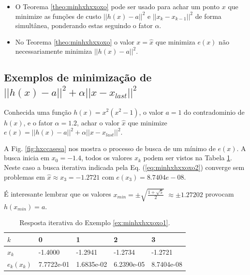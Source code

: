 \begin{tcbattention}
\begin{itemize}
\item O Teorema \ref{theo:minhxhxxoxo} pode ser usado para achar um ponto $x$
que minimize as funções de custo $||h(x)-a||^2$ e
 $||x_{k}-x_{k-1}||^2$ de forma simultânea, ponderando estas seguindo o fator $\alpha$.
\item No Teorema \ref{theo:minhxhxxoxo} o valor $x=\hat{x}$ 
que minimiza $e(x)$ não necessariamente minimiza $||h(x)-a||^2$.
\end{itemize}
\end{tcbattention}
\subsection{Exemplos de minimização de $||h(x)-a||^2+\alpha ||x-x_{last}||^2$}


\begin{example}\label{ex:minhxhxxoxo1}
Conhecida uma função $h(x)=x^2(x^2-1)$, o valor $a=1$ do contradominio de $h(x)$,
e o fator $\alpha=1.2$,
achar o valor $\hat{x}$ que minimize $e(x)=||h(x)-a||^2+\alpha||x-x_{last}||^2$.
\end{example}
\begin{SolutionT}\label{sol:minhxhxxoxo1}
 A Fig. \ref{fig:hxccasesa} nos mostra o processo de busca de um mínimo
 de $e(x)$. A busca inicia em $x_0=-1.4$,
 todos os valores $x_{k}$ podem ser vistos na Tabela \ref{tab:hxccases1}. 
Neste caso a busca iterativa indicada pela Eq. (\ref{eq:minhxhxxoxo2}) converge sem problemas 
em $\hat{x}\approx x_3 =-1.2721$ com $e(x_3)=8.7404e-08$.

É interesante lembrar que os valores $x_{min}=\pm \sqrt{\frac{1+\sqrt{5}}{2}}$ 
$\approx \pm 1.27202$ provocam $h(x_{min})=a$.
\end{SolutionT}

\begin{table}[!h]
\centering
\begin{tabular}{|l|l|l|l|l|}
\hline
$k$      & 0 & 1 & 2 & 3 \\ \hline
$x_k$    & -1.4000 & -1.2941 & -1.2734 & -1.2721 \\ \hline
$e_k(x_k)$ & 7.7722e-01 & 1.6835e-02 & 6.2390e-05 & 8.7404e-08 \\ \hline
\end{tabular}
\caption{Resposta iterativa do Exemplo \ref{ex:minhxhxxoxo1}.}
\label{tab:hxccases1}
\end{table}


